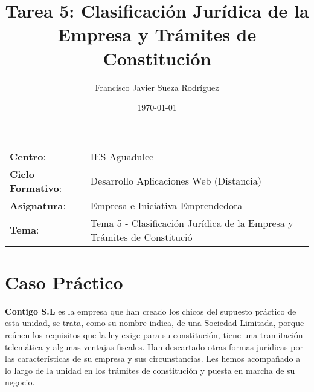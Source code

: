 


\title{
\vspace{10ex}
\normalfont \normalsize
\huge \textbf{Tarea 5: Clasificación Jurídica de la Empresa y Trámites de Constitución}
}
\author{Francisco Javier Sueza Rodríguez}
\date{\normalsize\today}



\maketitle

\thispagestyle{empty}

\vspace{65ex}

\begin{center}
    \begin{tabular}{l l}
        \textbf{Centro}: & IES Aguadulce \\
        \textbf{Ciclo Formativo}: & Desarrollo Aplicaciones Web (Distancia)\\
        \textbf{Asignatura}: & Empresa e Iniciativa Emprendedora\\
        \textbf{Tema}: & Tema 5 - Clasificación Jurídica de la Empresa y Trámites de Constitució\\
    \end{tabular}
\end{center}

\newpage

\tableofcontents

\newpage

\section{Caso Práctico}
\textbf{Contigo S.L} es la empresa que han creado los chicos del supuesto práctico de esta unidad, se trata, como su nombre indica, de una Sociedad Limitada, porque reúnen los requisitos que la ley exige para su constitución, tiene una tramitación telemática y algunas ventajas fiscales. Han descartado otras formas jurídicas por las características de su empresa y sus circunstancias. Les hemos acompañado a lo largo de la unidad en los trámites de constitución y puesta en marcha de su negocio.

